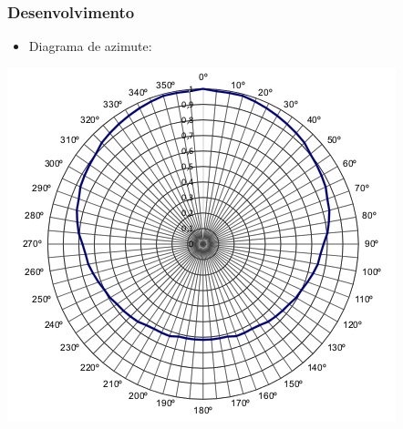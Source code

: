 \documentclass{beamer}
\begin{document}
                \begin{frame}
    
      \frametitle{Desenvolvimento}
      
      \begin{itemize}
            
      \item Diagrama de azimute:
      
      \end{itemize}
	 
      \begin{center}
      
           \includegraphics[width=.6\linewidth]{figs/diagrama_de_irradiacao.jpg}	
           
        \end{center}
      
      \end{frame} 
    
\end{document}
